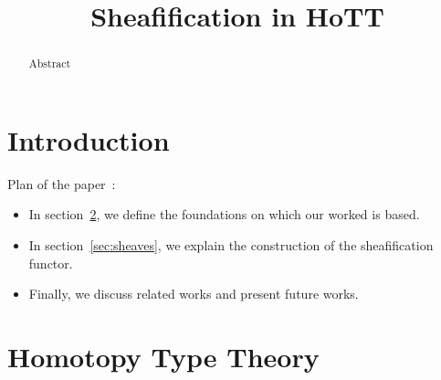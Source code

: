 \documentclass[conference]{IEEEtran}
\begin{document}
%
\title{Sheafification in HoTT}


\author{
}



\maketitle

\begin{abstract}
Abstract
\end{abstract}


\section{Introduction}
\label{sec:intro}

Plan of the paper~:
\begin{itemize}
\item In section~\ref{sec:hott}, we define the foundations on which
  our worked is based.
\item In section~\ref{sec:sheaves}, we explain the construction of the
  sheafification functor.
\item Finally, we discuss related works and present future works.
\end{itemize}
\section{Homotopy Type Theory}
\label{sec:hott}
\end{document}
